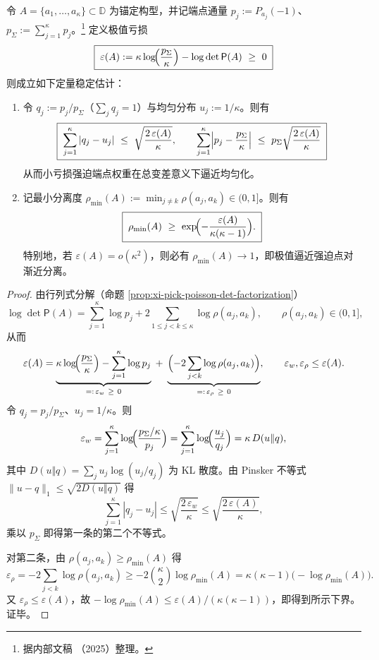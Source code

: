 \begin{corollary}\label{cor:xi-anchored-capacity-extremal-stability-quant}
令 \(A=\{a_1,\dots,a_\kappa\}\subset\mathbb{D}\) 为锚定构型，并记端点通量 \(p_j:=P_{a_j}(-1)\)、\(p_{\Sigma}:=\sum_{j=1}^{\kappa}p_j\)。\footnote{据内部文稿 \cite{Internal2025ResolutionFoldingPhiPi}（2025）整理。}
定义极值亏损
\[
\boxed{\;
\varepsilon(A):=\kappa\log\!\Bigl(\frac{p_{\Sigma}}{\kappa}\Bigr)-\log\det\mathsf P(A)\ \ge\ 0\;}
\]
则成立如下定量稳定估计：
\begin{enumerate}
  \item 令 \(q_j:=p_j/p_{\Sigma}\)（\(\sum_j q_j=1\)）与均匀分布 \(u_j:=1/\kappa\)。则有
  \[
  \boxed{\;
  \sum_{j=1}^{\kappa}|q_j-u_j|
  \ \le\ 
  \sqrt{\frac{2\,\varepsilon(A)}{\kappa}},\qquad
  \sum_{j=1}^{\kappa}\Bigl|p_j-\frac{p_{\Sigma}}{\kappa}\Bigr|
  \ \le\
  p_{\Sigma}\sqrt{\frac{2\,\varepsilon(A)}{\kappa}}\;}
  \]
  从而小亏损强迫端点权重在总变差意义下逼近均匀化。
  \item 记最小分离度 \(\rho_{\min}(A):=\min_{j\ne k}\rho(a_j,a_k)\in(0,1]\)。则有
  \[
  \boxed{\;
  \rho_{\min}(A)\ \ge\ \exp\!\Bigl(-\frac{\varepsilon(A)}{\kappa(\kappa-1)}\Bigr).\;}
  \]
  特别地，若 \(\varepsilon(A)=o(\kappa^2)\)，则必有 \(\rho_{\min}(A)\to 1\)，即极值逼近强迫点对渐近分离。
\end{enumerate}
\end{corollary}

\begin{proof}
由行列式分解（命题 \ref{prop:xi-pick-poisson-det-factorization}）
\[
\log\det\mathsf P(A)
=\sum_{j=1}^{\kappa}\log p_j+2\sum_{1\le j<k\le \kappa}\log\rho(a_j,a_k),
 \qquad \rho(a_j,a_k)\in(0,1],
\]
从而
\[
\varepsilon(A)
=\underbrace{\kappa\log\!\Bigl(\frac{p_{\Sigma}}{\kappa}\Bigr)-\sum_{j=1}^{\kappa}\log p_j}_{=:\,\varepsilon_w\ \ge\ 0}
\;+\;
\underbrace{\Bigl(-2\sum_{j<k}\log\rho(a_j,a_k)\Bigr)}_{=:\,\varepsilon_\rho\ \ge\ 0},
\qquad \varepsilon_w,\varepsilon_\rho\le \varepsilon(A).
\]
令 \(q_j=p_j/p_{\Sigma}\)、\(u_j=1/\kappa\)。则
\[
\varepsilon_w=\sum_{j=1}^{\kappa}\log\!\Bigl(\frac{p_{\Sigma}/\kappa}{p_j}\Bigr)
=\sum_{j=1}^{\kappa}\log\!\Bigl(\frac{u_j}{q_j}\Bigr)
=\kappa\,D(u\Vert q),
\]
其中 \(D(u\Vert q)=\sum_j u_j\log(u_j/q_j)\) 为 KL 散度。由 Pinsker 不等式
\(\|u-q\|_1\le\sqrt{2D(u\Vert q)}\)
得
\[
\sum_{j=1}^{\kappa}|q_j-u_j|
\le
\sqrt{\frac{2\,\varepsilon_w}{\kappa}}
\le
\sqrt{\frac{2\,\varepsilon(A)}{\kappa}},
\]
乘以 \(p_{\Sigma}\) 即得第一条的第二个不等式。
\par
对第二条，由 \(\rho(a_j,a_k)\ge\rho_{\min}(A)\) 得
\[
\varepsilon_\rho
=-2\sum_{j<k}\log\rho(a_j,a_k)
\ge
-2\binom{\kappa}{2}\log\rho_{\min}(A)
=\kappa(\kappa-1)\bigl(-\log\rho_{\min}(A)\bigr).
\]
又 \(\varepsilon_\rho\le \varepsilon(A)\)，故
\(-\log\rho_{\min}(A)\le \varepsilon(A)/(\kappa(\kappa-1))\)，即得到所示下界。证毕。
\end{proof}

